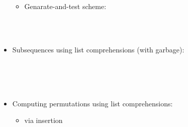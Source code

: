 \documentclass{beamer}
\begin{document}
\begin{itemize}
\begin{itemize}
    {}{}{\hlopt{=
    }}{}{\hlendline{}}\\
    {\hlstd{ \ }}{\hlopt{\textbar  [] -> []}}{\hlendline{}}\\
    {\hlstd{ \ }}{\hlopt{\textbar  [}}{}{\hlopt{] -> [}}{}{}{\hlopt{]}}{\hlendline{}}\\
    {}{\hlopt{->}}{\hlendline{}}\\
    {\hlstd{ \ \ \ }}{\hlopt{[}}{}{\hlopt{(}}{}{\hlopt{,}}{}{\hlopt{,}}{}{\hlopt{)
    \textbar  (}}{}{\hlopt{,}}{}{\hlopt{) <-
    }}{}{\hlopt{;}}{\hlendline{}}\\
    {}{\hlopt{<- }}{}{\hlopt{; }}{}{\hlopt{<- }}{}{\hlopt{;}}{\hlendline{}}\\
    {}{\hlopt{<- [}}{}{\hlopt{;
    }}{}{\hlopt{; }}{}{\hlopt{;
    }}{}{\hlopt{]]}}{\hlendline{}}
    
    \item Genarate-and-test scheme:
    
    {}{}{\hlopt{=}}{\hlendline{}}\\
    {\hlstd{ \ }}{\hlopt{[}}{}{\hlopt{<-
    }}{}{\hlopt{;}}{\hlendline{}}\\
    {}{\hlopt{<- }}{}{\hlopt{; }}{}{\hlopt{= }}{}{}{\hlopt{]}}{\hlendline{}}
  \end{itemize}
  \item Subsequences using list comprehensions (with garbage):
  
  {}{}{\hlopt{=}}{\hlendline{}}\\
  {\hlstd{ \ }}{}{}{}{\hlendline{}}\\
  {\hlstd{ \ \ \ }}{\hlopt{\textbar  [] -> [[]]}}{\hlendline{}}\\
  {}{\hlopt{::}}{}{\hlopt{->
  [}}{}{\hlopt{<- }}{}{\hlopt{; }}{}{\hlopt{<- [}}{}{\hlopt{;
  }}{}{\hlopt{::}}{}{\hlopt{]]}}{\hlendline{}}
  
  \item Computing permutations using list comprehensions:
  \begin{itemize}
    \item via insertion
    

\end{itemize}
\end{itemize}
\end{document}
